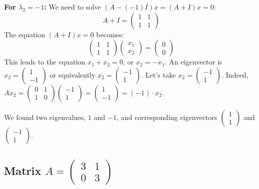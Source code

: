 \documentclass{article}
\begin{document}
\textbf{For $\lambda_2 = -1$:}
We need to solve $(A - (-1)I)x = (A + I)x = 0$:
\[A + I = \begin{pmatrix} 1 & 1 \\ 1 & 1 \end{pmatrix}\]
The equation $(A + I)x = 0$ becomes:
\[\begin{pmatrix} 1 & 1 \\ 1 & 1 \end{pmatrix} \begin{pmatrix} x_1 \\ x_2 \end{pmatrix} = \begin{pmatrix} 0 \\ 0 \end{pmatrix}\]
This leads to the equation $x_1 + x_2 = 0$, or $x_2 = -x_1$. An eigenvector is $x_2 = \begin{pmatrix} 1 \\ -1 \end{pmatrix}$ or equivalently $x_2 = \begin{pmatrix} -1 \\ 1 \end{pmatrix}$. Let's take $x_2 = \begin{pmatrix} -1 \\ 1 \end{pmatrix}$.
Indeed, $A x_2 = \begin{pmatrix} 0 & 1 \\ 1 & 0 \end{pmatrix} \begin{pmatrix} -1 \\ 1 \end{pmatrix} = \begin{pmatrix} 1 \\ -1 \end{pmatrix} = (-1) \cdot x_2$.

We found two eigenvalues, $1$ and $-1$, and corresponding eigenvectors $\begin{pmatrix} 1 \\ 1 \end{pmatrix}$ and $\begin{pmatrix} -1 \\ 1 \end{pmatrix}$.

\subsection{Matrix $A = \begin{pmatrix} 3 & 1 \\ 0 & 3 \end{pmatrix}$}
\end{document}

